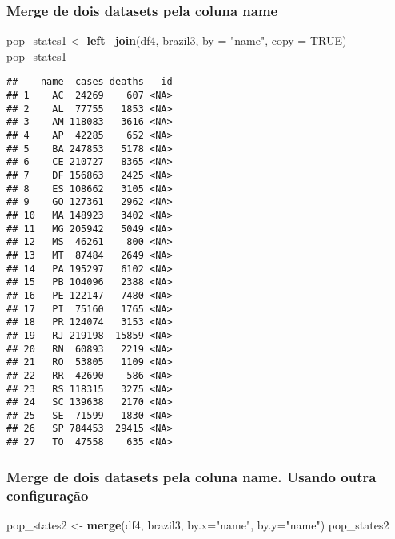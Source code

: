 \documentclass[
]{article}
\newenvironment{Shaded}{\begin{snugshade}}{\end{snugshade}}
\newcommand{\DataTypeTok}[1]{\textcolor[rgb]{0.13,0.29,0.53}{#1}}
\newcommand{\KeywordTok}[1]{\textcolor[rgb]{0.13,0.29,0.53}{\textbf{#1}}}
\newcommand{\NormalTok}[1]{#1}
\newcommand{\OtherTok}[1]{\textcolor[rgb]{0.56,0.35,0.01}{#1}}
\newcommand{\StringTok}[1]{\textcolor[rgb]{0.31,0.60,0.02}{#1}}
\begin{document}
\hypertarget{merge-de-dois-datasets-pela-coluna-name}{%
\subsubsection{Merge de dois datasets pela coluna
name}\label{merge-de-dois-datasets-pela-coluna-name}}

\begin{Shaded}
\begin{Highlighting}[]
\NormalTok{pop\_states1 \textless{}{-}}\StringTok{ }\KeywordTok{left\_join}\NormalTok{(df4, brazil3, }\DataTypeTok{by =} \StringTok{"name"}\NormalTok{, }\DataTypeTok{copy =} \OtherTok{TRUE}\NormalTok{)}
\NormalTok{pop\_states1}
\end{Highlighting}
\end{Shaded}

\begin{verbatim}
##    name  cases deaths   id
## 1    AC  24269    607 <NA>
## 2    AL  77755   1853 <NA>
## 3    AM 118083   3616 <NA>
## 4    AP  42285    652 <NA>
## 5    BA 247853   5178 <NA>
## 6    CE 210727   8365 <NA>
## 7    DF 156863   2425 <NA>
## 8    ES 108662   3105 <NA>
## 9    GO 127361   2962 <NA>
## 10   MA 148923   3402 <NA>
## 11   MG 205942   5049 <NA>
## 12   MS  46261    800 <NA>
## 13   MT  87484   2649 <NA>
## 14   PA 195297   6102 <NA>
## 15   PB 104096   2388 <NA>
## 16   PE 122147   7480 <NA>
## 17   PI  75160   1765 <NA>
## 18   PR 124074   3153 <NA>
## 19   RJ 219198  15859 <NA>
## 20   RN  60893   2219 <NA>
## 21   RO  53805   1109 <NA>
## 22   RR  42690    586 <NA>
## 23   RS 118315   3275 <NA>
## 24   SC 139638   2170 <NA>
## 25   SE  71599   1830 <NA>
## 26   SP 784453  29415 <NA>
## 27   TO  47558    635 <NA>
\end{verbatim}

\hypertarget{merge-de-dois-datasets-pela-coluna-name.-usando-outra-configurauxe7uxe3o}{%
\subsubsection{Merge de dois datasets pela coluna name. Usando outra
configuração}\label{merge-de-dois-datasets-pela-coluna-name.-usando-outra-configurauxe7uxe3o}}

\begin{Shaded}
\begin{Highlighting}[]
\NormalTok{pop\_states2 \textless{}{-}}\StringTok{ }\KeywordTok{merge}\NormalTok{(df4, brazil3, }\DataTypeTok{by.x=}\StringTok{"name"}\NormalTok{, }\DataTypeTok{by.y=}\StringTok{"name"}\NormalTok{)}
\NormalTok{pop\_states2}
\end{Highlighting}
\end{Shaded}
\end{document}
